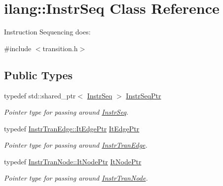 \hypertarget{classilang_1_1_instr_seq}{}\section{ilang\+:\+:Instr\+Seq Class Reference}
\label{classilang_1_1_instr_seq}


Instruction Sequencing does\+:  




{\ttfamily \#include $<$transition.\+h$>$}

\subsection*{Public Types}
\begin{DoxyCompactItemize}
\item 
\mbox{\label{classilang_1_1_instr_seq_a37dd168ce5d95507eb7bf53455d79b80}} 
typedef std\+::shared\+\_\+ptr$<$ \mbox{\hyperlink{classilang_1_1_instr_seq}{Instr\+Seq}} $>$ \mbox{\hyperlink{classilang_1_1_instr_seq_a37dd168ce5d95507eb7bf53455d79b80}{Instr\+Seq\+Ptr}}
\begin{DoxyCompactList}\small\item\em Pointer type for passing around \mbox{\hyperlink{classilang_1_1_instr_seq}{Instr\+Seq}}. \end{DoxyCompactList}\item 
\mbox{\label{classilang_1_1_instr_seq_ad6cdd19a1f5c41fa5e381bd8fa024cbc}} 
typedef \mbox{\hyperlink{classilang_1_1_instr_tran_edge_ada0821479c930f2895d2614405d3971f}{Instr\+Tran\+Edge\+::\+It\+Edge\+Ptr}} \mbox{\hyperlink{classilang_1_1_instr_seq_ad6cdd19a1f5c41fa5e381bd8fa024cbc}{It\+Edge\+Ptr}}
\begin{DoxyCompactList}\small\item\em Pointer type for passing around \mbox{\hyperlink{classilang_1_1_instr_tran_edge}{Instr\+Tran\+Edge}}. \end{DoxyCompactList}\item 
\mbox{\label{classilang_1_1_instr_seq_a8733287d8a758300cbed05c5d86df2f5}} 
typedef \mbox{\hyperlink{classilang_1_1_instr_tran_node_a449144ce50eff60a35867b970f4608c6}{Instr\+Tran\+Node\+::\+It\+Node\+Ptr}} \mbox{\hyperlink{classilang_1_1_instr_seq_a8733287d8a758300cbed05c5d86df2f5}{It\+Node\+Ptr}}
\begin{DoxyCompactList}\small\item\em Pointer type for passing around \mbox{\hyperlink{classilang_1_1_instr_tran_node}{Instr\+Tran\+Node}}. \end{DoxyCompactList}\item 

\end{DoxyCompactItemize}

